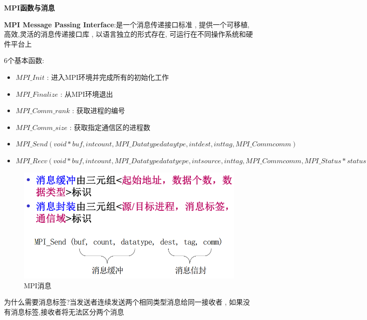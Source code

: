 \documentclass[UTF8,a4paper]{ctexart}
\begin{document}
\textbf{MPI函数与消息}

\textbf{MPI Message Passing Interface}:是一个消息传递接口标准 , 提供一个可移植,高效,灵活的消息传递接口库 , 以语言独立的形式存在, 可运行在不同操作系统和硬件平台上

6个基本函数:
\begin{itemize}
  \item $MPI\_Init$ : 进入MPI环境并完成所有的初始化工作
  \item $MPI\_Finalize$ : 从MPI环境退出
  \item $MPI\_Comm\_rank$ : 获取进程的编号
  \item $MPI\_Comm\_size$ : 获取指定通信区的进程数
  \item $MPI\_Send( void *buf, int count, MPI\_Datatype
dataytpe, int dest, int tag, MPI\_Comm comm)$
  \item $MPI\_Recv(void *buf, int count, MPI\_Datatype
datatyepe, int source, int tag, MPI\_Comm comm,MPI\_Status *status)$
\end{itemize}

\begin{figure}[H]
  \centering
  \includegraphics[scale = 0.3]{assets/ParallelComputing_c4505.png}
  \caption{MPI消息}
\end{figure}

为什么需要消息标签?当发送者连续发送两个相同类型消息给同一接收者 , 如果没有消息标签,接收者将无法区分两个消息
\end{document}
